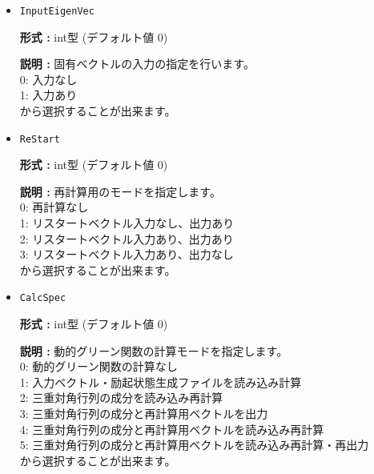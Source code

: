 \begin{itemize}
{\bf 形式 :} {int型 (デフォルト値 0)}

{\bf 説明 :} {固有ベクトルの出力の指定を行います。\\
0: 出力なし\\
1: 出力あり\\
から選択することが出来ます。}

\item  \verb|InputEigenVec|

{\bf 形式 :} {int型 (デフォルト値 0)}

{\bf 説明 :} {固有ベクトルの入力の指定を行います。\\
0: 入力なし\\
1: 入力あり\\
から選択することが出来ます。}

\item  \verb|ReStart|

{\bf 形式 :} {int型 (デフォルト値 0)}

{\bf 説明 :} {
{
再計算用のモードを指定します。\\
0: 再計算なし\\
1: リスタートベクトル入力なし、出力あり\\
2: リスタートベクトル入力あり、出力あり\\
3: リスタートベクトル入力あり、出力なし\\
から選択することが出来ます。
}
}

\item  \verb|CalcSpec|

{\bf 形式 :} {int型 (デフォルト値 0)}

{\bf 説明 :} {
{
動的グリーン関数の計算モードを指定します。\\
0: 動的グリーン関数の計算なし\\
1: 入力ベクトル・励起状態生成ファイルを読み込み計算\\
2: 三重対角行列の成分を読み込み再計算\\
3: 三重対角行列の成分と再計算用ベクトルを出力\\
4: 三重対角行列の成分と再計算用ベクトルを読み込み再計算\\
5: 三重対角行列の成分と再計算用ベクトルを読み込み再計算・再出力\\
から選択することが出来ます。}
}


\end{itemize}

\newpage
